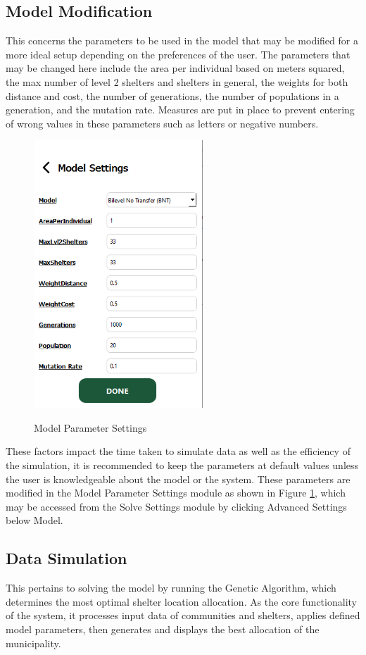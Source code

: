 \subsection{Model Modification}
	This concerns the parameters to be used in the model that may be modified for a more ideal setup depending on the preferences of the user. The parameters that may be changed here include the area per individual based on meters squared, the max number of level 2 shelters and shelters in general, the weights for both distance and cost, the number of generations, the number of populations in a generation, and the mutation rate. Measures are put in place to prevent entering of wrong values in these parameters such as letters or negative numbers. 
	
	\begin{figure}[h!]
		\caption{Model Parameter Settings}
		\centering
		\includegraphics[width=2.5in]{Chapter 4/modelsettings}
		\label{modelSet}
	\end{figure}
	These factors impact the time taken to simulate data as well as the efficiency of the simulation, it is recommended to keep the parameters at default values unless the user is knowledgeable about the model or the system. These parameters are modified in the Model Parameter Settings module as shown in Figure \ref{modelSet}, which may be accessed from the Solve Settings module by clicking Advanced Settings below Model.
	
	
\subsection{Data Simulation}
	This pertains to solving the model by running the Genetic Algorithm, which determines the most optimal shelter location allocation. As the core functionality of the system, it processes input data of communities and shelters, applies defined model parameters, then generates and displays the best allocation of the municipality.
	
